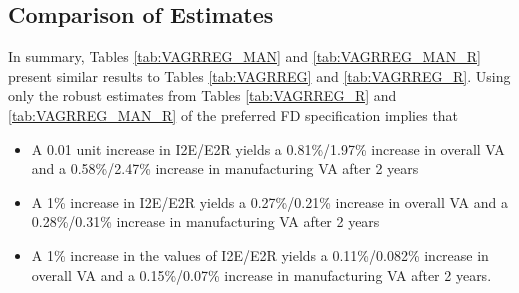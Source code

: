 \documentclass[a4paper]{article}
\begin{document}
\subsection{Comparison of Estimates}
In summary, Tables \ref{tab:VAGRREG_MAN} and \ref{tab:VAGRREG_MAN_R} present similar results to Tables \ref{tab:VAGRREG} and \ref{tab:VAGRREG_R}. Using only the robust estimates from Tables \ref{tab:VAGRREG_R} and \ref{tab:VAGRREG_MAN_R} of the preferred FD specification implies that
\begin{itemize}
\item A 0.01 unit increase in I2E/E2R yields a 0.81\%/1.97\% increase in overall VA and a 0.58\%/2.47\% increase in manufacturing VA after 2 years
\item A 1\% increase in I2E/E2R yields a 0.27\%/0.21\% increase in overall VA and a 0.28\%/0.31\% increase in manufacturing VA after 2 years
\item A 1\% increase in the values of I2E/E2R yields a 0.11\%/0.082\% increase in overall VA and a 0.15\%/0.07\% increase in manufacturing VA after 2 years.
\end{itemize}

\end{document}
